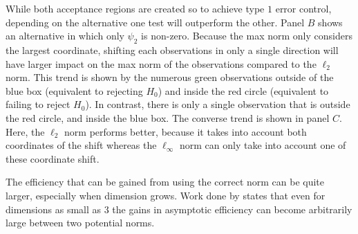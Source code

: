 \documentclass{article}
\newcommand{\vmat}{\Sigma}
\newcommand{\rvv}{Z}
\newcommand{\distv}{Q}
\begin{document}
While both acceptance regions are created so to achieve type $1$ error control, depending on the alternative one test will outperform the other. Panel $B$ shows an alternative in which only $\psi_2$ is non-zero.  Because the max norm only considers the largest coordinate, shifting each observations in only a single direction will have larger impact on the max norm of the observations compared to the $\ell_2$ norm.  This trend is shown by the numerous green observations outside of the blue box (equivalent to rejecting $H_0$) and inside the red circle (equivalent to failing to reject $H_0$). In contrast, there is only a single observation that is outside the red circle, and inside the blue box. The converse trend is shown in panel $C$. Here, the $\ell_2$ norm performs better, because it takes into account both coordinates of the shift whereas the $\ell_\infty$ norm can only take into account one of these coordinate shift. 

The efficiency that can be gained from using the correct norm can be quite larger, especially when dimension grows.  Work done by \citep{pinelis_schur2-concavity_2014} states that even for dimensions as small as $3$ the gains in asymptotic efficiency can become arbitrarily large between two potential norms.  


\end{document}
